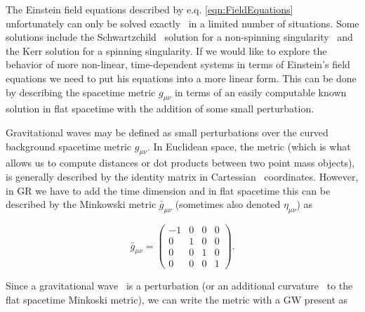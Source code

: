 %
%
The Einstein field equations described by e.q. \ref{eqn:FieldEquations}~ unfortunately can only be solved exactly~ in a limited number of situations. Some solutions include the Schwartzchild~ solution for a non-spinning singularity~ and the Kerr solution for a spinning singularity. If we would like to explore the behavior of more non-linear, time-dependent systems in terms of Einstein's field equations we need to put his equations into a more linear form. This can be done by describing the spacetime metric $g_{\mu\nu}$ in terms of an easily computable known solution in flat spacetime with the addition of some small perturbation.~

%
%
Gravitational waves may be defined as small perturbations over the curved background spacetime metric $g_{\mu \nu}$. In Euclidean space, the metric (which is what allows us to compute distances or dot products between two point mass objects), is generally described by the identity matrix in Cartessian~ coordinates. However, in \ac{GR} we have to add the time dimension and in flat spacetime this can be described by the Minkowski metric $\bar{g}_{\mu \nu}$ (sometimes also denoted $\eta_{\mu \nu}$) as~

\begin{equation}
  \bar{g}_{\mu \nu} =   \begin{pmatrix}
-1 & 0 & 0 & 0\\
0 & 1 & 0 & 0\\
0 & 0 & 1 & 0\\
0 & 0 & 0 & 1
\end{pmatrix}.
\end{equation}

Since a gravitational wave~ is a perturbation (or an additional curvature~ to the flat spacetime Minkoski metric), we can write the metric with a \ac{GW} present as  

